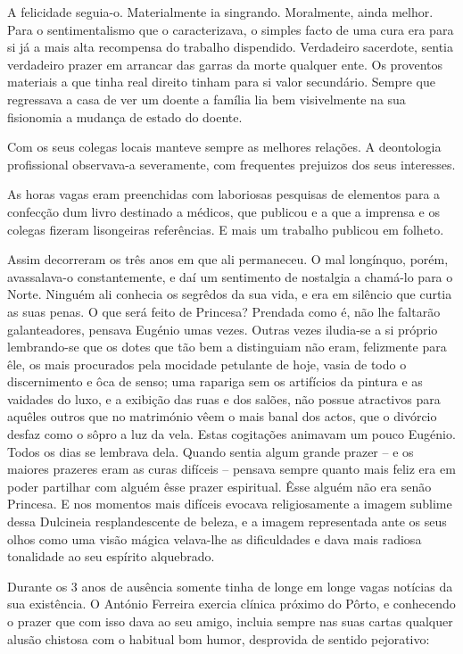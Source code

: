 \documentclass[9pt]{article}
\begin{document}
A felicidade seguia-o. Materialmente ia singrando. Moralmente,
ainda me\-lhor. Para o sentimentalismo que o ca\-ra\-cte\-ri\-zava, o simples
facto de uma cura era para si já a mais alta recompensa do traba\-lho
dispendido. Verdadeiro sacerdote, sentia verdadeiro prazer em arrancar das garras da morte qualquer ente. Os proventos materiais a que
tinha real direito tinham para si valor secundário. Sempre que regressava a casa de ver um doente a fa\-mí\-lia lia bem visivelmente na sua fisionomia a mudança de estado do doente.

Com os seus colegas locais manteve sempre as me\-lhores rela\-ções.
A deontologia profissional observava-a severamente, com frequentes prejuizos dos seus interesses.

As horas vagas eram preenchidas com laboriosas pesquisas de elementos para a confec\-ção dum livro destinado a médicos, que publicou
e a que a imprensa e os colegas fizeram lisongeiras referências. E
mais um traba\-lho publicou em fo\-lheto.

Assim decorreram os três anos em que ali permaneceu. O mal long\-ínquo, porém, avassalava-o constantemente, e daí um sentimento de nostalgia a chamá-lo para o Norte. Ninguém ali conhecia os segrêdos da
sua vida, e era em silêncio que curtia as suas penas. O que será feito
de Princesa? Prendada como é, não lhe faltarão galanteadores, pensava
Eugé\-nio umas vezes. Outras vezes iludia-se a si próprio lembrando-se
que os dotes que tão bem a distinguiam não eram, felizmente para êle,
os mais procurados pela mocidade petulante de hoje, vasia de todo o
discernimento e ôca de senso; uma rapariga sem os artifícios da pintura e as vaidades do luxo, e a exibi\-ção das ruas e dos salões, não possue atractivos para a\-quê\-les outros que no matrimónio vêem o mais banal dos actos, que o divórcio desfaz como o sôpro a luz da vela. Estas
cogita\-ções animavam um pouco Eugé\-nio. Todos os dias se lembrava dela.
Quando sentia algum gran\-de prazer -- e os maiores prazeres eram as
curas difíceis -- pensava sempre quanto mais feliz era em poder parti\-lhar com alguém êsse prazer espiritual. Êsse alguém não era senão Princesa. E nos momentos mais difíceis evocava religiosamente a imagem
sublime dessa Dulcineia resplandescente de beleza, e a imagem representada ante os seus o\-lhos como uma visão mágica velava-\-lhe as  dificuldades
e dava mais radiosa tonalidade ao seu espírito alquebrado.

Durante os 3 anos de ausência somente tinha de longe em longe
vagas notícias da sua exis\-tên\-cia. O António Ferreira exercia clínica
próximo do Pôrto, e conhecendo o prazer que com isso dava ao seu amigo,
incluia sempre nas suas cartas qualquer alusão chistosa com o habitual bom
humor, desprovida de sentido pejorativo:
\end{document}
